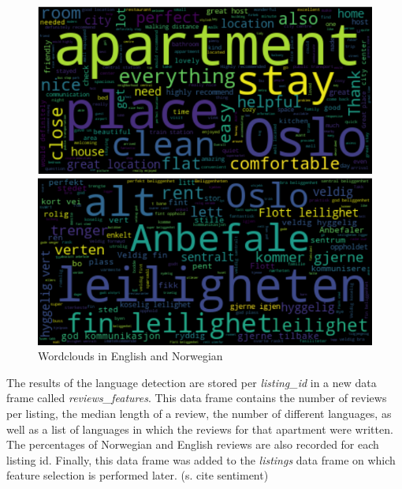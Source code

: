 \documentclass[12pt, letterpaper]{article}
\begin{document}
\begin{figure}[t]
    \centering
    \begin{minipage}{6.7cm}
        \includegraphics[width=\columnwidth]{wordcloud_eng.png}
    \end{minipage}
    \begin{minipage}{6.7cm}
        \includegraphics[width=\columnwidth]{wordcloud_nor.png}
    \end{minipage}
    \caption{Wordclouds in English and Norwegian}
    \label{fig:wordclouds}
\end{figure}

The results of the language detection are stored per \textit{listing\_id} in a new data frame called \textit{reviews\_features}. 
This data frame contains the number of reviews per listing, the median length of a review, the number of different languages, 
as well as a list of languages in which the reviews for that apartment were written. The percentages of Norwegian and English reviews are 
also recorded for each listing id. Finally, this data frame was added to the \textit{listings} data frame on which feature selection 
is performed later. (s. cite sentiment)
\end{document}
